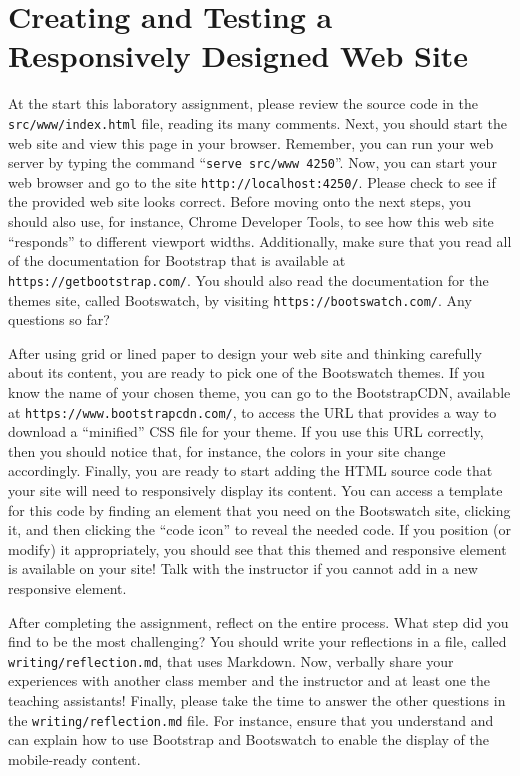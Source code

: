 \documentclass[11pt]{article}
\newcommand{\mainprogramsource}{\lstinline{src/www/index.html}}
\newcommand{\reflection}{\lstinline{writing/reflection.md}}
\newcommand{\command}[1]{``\lstinline{#1}''}
\newcommand{\program}[1]{\lstinline{#1}}
\newcommand{\url}[1]{\lstinline{#1}}
\begin{document}
\section*{Creating and Testing a Responsively Designed Web Site}

At the start this laboratory assignment, please review the source code in the
\mainprogramsource{} file, reading its many comments. Next, you should start the
web site and view this page in your browser. Remember, you can run your web
server by typing the command \command{serve src/www 4250}. Now, you can start
your web browser and go to the site \url{http://localhost:4250/}. Please check
to see if the provided web site looks correct. Before moving onto the next
steps, you should also use, for instance, Chrome Developer Tools, to see how
this web site ``responds'' to different viewport widths. Additionally, make sure
that you read all of the documentation for Bootstrap that is available at
\program{https://getbootstrap.com/}. You should also read the documentation for
the themes site, called Bootswatch, by visiting
\program{https://bootswatch.com/}. Any questions so far?

After using grid or lined paper to design your web site and thinking carefully
about its content, you are ready to pick one of the Bootswatch themes. If you
know the name of your chosen theme, you can go to the BootstrapCDN, available at
\program{https://www.bootstrapcdn.com/}, to access the URL that provides a way
to download a ``minified'' CSS file for your theme. If you use this URL
correctly, then you should notice that, for instance, the colors in your site
change accordingly. Finally, you are ready to start adding the HTML source code
that your site will need to responsively display its content. You can access a
template for this code by finding an element that you need on the Bootswatch
site, clicking it, and then clicking the ``code icon'' to reveal the needed
code. If you position (or modify) it appropriately, you should see that this
themed and responsive element is available on your site! Talk with the
instructor if you cannot add in a new responsive element.

After completing the assignment, reflect on the entire process. What step did
you find to be the most challenging? You should write your reflections in a
file, called \reflection{}, that uses Markdown. Now, verbally share your
experiences with another class member and the instructor and at least one the
teaching assistants! Finally, please take the time to answer the other questions
in the \reflection{} file. For instance, ensure that you understand and can
explain how to use Bootstrap and Bootswatch to enable the display of the
mobile-ready content.
\end{document}
